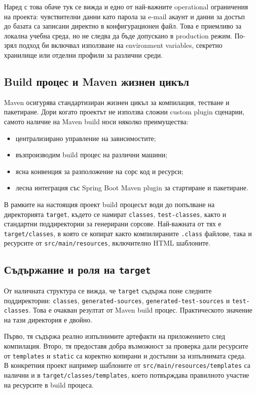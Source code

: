 Наред с това обаче тук се вижда и едно от най-важните operational ограничения на проекта: чувствителни данни като парола за e-mail акаунт и данни за достъп до базата са записани директно в конфигурационен файл. Това е приемливо за локална учебна среда, но не следва да бъде допускано в production режим. По-зрял подход би включвал използване на environment variables, секретно хранилище или отделни профили за различни среди.

\subsection{Build процес и Maven жизнен цикъл}

Maven \cite{maven} осигурява стандартизиран жизнен цикъл за компилация, тестване и пакетиране. Дори когато проектът не използва сложни custom plugin сценарии, самото наличие на Maven build носи няколко преимущества:

\begin{itemize}[leftmargin=*]
    \item централизирано управление на зависимостите;
    \item възпроизводим build процес на различни машини;
    \item ясна конвенция за разположение на сорс код и ресурси;
    \item лесна интеграция със Spring Boot Maven plugin за стартиране и пакетиране.
\end{itemize}

В рамките на настоящия проект build процесът води до попълване на директорията \texttt{target}, където се намират \texttt{classes}, \texttt{test-classes}, както и стандартни поддиректории за генерирани сорсове. Най-важната от тях е \texttt{target/classes}, в която се копират както компилираните \texttt{.class} файлове, така и ресурсите от \texttt{src/main/resources}, включително HTML шаблоните.

\subsection{Съдържание и роля на \texttt{target}}

От наличната структура се вижда, че \texttt{target} съдържа поне следните поддиректории: \texttt{classes}, \texttt{generated-sources}, \texttt{generated-test-sources} и \texttt{test-classes}. Това е очакван резултат от Maven build процес. Практическото значение на тази директория е двойно.

Първо, тя съдържа реално изпълнимите артефакти на приложението след компилация. Второ, тя предоставя добра възможност за проверка дали ресурсите от \texttt{templates} и \texttt{static} са коректно копирани и достъпни за изпълнимата среда. В конкретния проект например шаблоните от \texttt{src/main/resources/templates} са налични и в \texttt{target/classes/templates}, което потвърждава правилното участие на ресурсите в build процеса.

